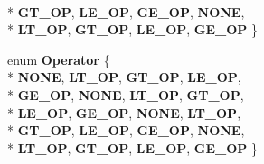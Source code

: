 \begin{DoxyCompactItemize}
\\*
{\bfseries G\-T\-\_\-\-O\-P}, 
{\bfseries L\-E\-\_\-\-O\-P}, 
{\bfseries G\-E\-\_\-\-O\-P}, 
{\bfseries N\-O\-N\-E}, 
\\*
{\bfseries L\-T\-\_\-\-O\-P}, 
{\bfseries G\-T\-\_\-\-O\-P}, 
{\bfseries L\-E\-\_\-\-O\-P}, 
{\bfseries G\-E\-\_\-\-O\-P}
 \}
\item 
enum {\bfseries Operator} \{ \\*
{\bfseries N\-O\-N\-E}, 
{\bfseries L\-T\-\_\-\-O\-P}, 
{\bfseries G\-T\-\_\-\-O\-P}, 
{\bfseries L\-E\-\_\-\-O\-P}, 
\\*
{\bfseries G\-E\-\_\-\-O\-P}, 
{\bfseries N\-O\-N\-E}, 
{\bfseries L\-T\-\_\-\-O\-P}, 
{\bfseries G\-T\-\_\-\-O\-P}, 
\\*
{\bfseries L\-E\-\_\-\-O\-P}, 
{\bfseries G\-E\-\_\-\-O\-P}, 
{\bfseries N\-O\-N\-E}, 
{\bfseries L\-T\-\_\-\-O\-P}, 
\\*
{\bfseries G\-T\-\_\-\-O\-P}, 
{\bfseries L\-E\-\_\-\-O\-P}, 
{\bfseries G\-E\-\_\-\-O\-P}, 
{\bfseries N\-O\-N\-E}, 
\\*
{\bfseries L\-T\-\_\-\-O\-P}, 
{\bfseries G\-T\-\_\-\-O\-P}, 
{\bfseries L\-E\-\_\-\-O\-P}, 
{\bfseries G\-E\-\_\-\-O\-P}
 \}
\end{DoxyCompactItemize}
